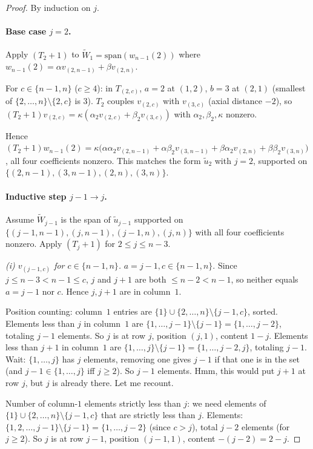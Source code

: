 \documentclass[11pt]{article}
\theoremstyle{definition}
\begin{document}
\begin{proof}
By induction on $j$.

\paragraph{Base case $j = 2$.}  Apply $(T_2{+}1)$ to
$\widetilde{W}_1 = \mathrm{span}(w_{n-1}(2))$ where
$w_{n-1}(2) = \alpha v_{(2,n-1)} + \beta v_{(2,n)}$.

For $c \in \{n-1,n\}$ ($c \ge 4$): in $T_{(2,c)}$, $a = 2$ at $(1,2)$,
$b = 3$ at $(2,1)$ (smallest of $\{2,\ldots,n\}\setminus\{2,c\}$ is
$3$).  $T_2$ couples $v_{(2,c)}$ with $v_{(3,c)}$ (axial distance
$-2$), so $(T_2{+}1)v_{(2,c)} = \kappa(\alpha_2 v_{(2,c)} +
\beta_2 v_{(3,c)})$ with $\alpha_2,\beta_2,\kappa$ nonzero.

Hence $(T_2{+}1)w_{n-1}(2) = \kappa\bigl(\alpha\alpha_2 v_{(2,n-1)} +
\alpha\beta_2 v_{(3,n-1)} + \beta\alpha_2 v_{(2,n)} + \beta\beta_2 v_{(3,n)}\bigr)$,
all four coefficients nonzero.  This matches the form
$\widetilde{u}_2$ with $j = 2$, supported on
$\{(2,n-1),(3,n-1),(2,n),(3,n)\}$.

\paragraph{Inductive step $j-1 \to j$.}  Assume $\widetilde{W}_{j-1}$
is the span of $\widetilde{u}_{j-1}$ supported on
$\{(j-1,n-1),(j,n-1),(j-1,n),(j,n)\}$ with all four coefficients
nonzero.  Apply $(T_j{+}1)$ for $2 \le j \le n-3$.

\emph{(i) $v_{(j-1,c)}$ for $c \in \{n-1, n\}$.} $a = j-1, c \in \{n-1,n\}$.
Since $j \le n-3 < n-1 \le c$, $j$ and $j+1$ are both
$\le n-2 < n-1$, so neither equals $a = j-1$ nor $c$.  Hence $j, j+1$
are in column~$1$.

Position counting: column~$1$ entries are $\{1\}\cup\{2,\ldots,n\}\setminus\{j-1,c\}$,
sorted.  Elements less than $j$ in column~$1$ are
$\{1,\ldots,j-1\}\setminus\{j-1\} = \{1,\ldots,j-2\}$, totaling $j-1$
elements.  So $j$ is at row $j$, position $(j,1)$, content $1-j$.
Elements less than $j+1$ in column~$1$ are
$\{1,\ldots,j\}\setminus\{j-1\} = \{1,\ldots,j-2,j\}$, totaling $j-1$.
Wait: $\{1,\ldots,j\}$ has $j$ elements, removing one gives $j-1$ if
that one is in the set (and $j-1 \in \{1,\ldots,j\}$ iff $j \ge 2$).
So $j-1$ elements.  Hmm, this would put $j+1$ at row $j$, but $j$ is
already there.  Let me recount.

Number of column-$1$ elements strictly less than $j$: we need
elements of $\{1\}\cup\{2,\ldots,n\}\setminus\{j-1,c\}$ that are
strictly less than $j$.  Elements: $\{1,2,\ldots,j-1\}\setminus\{j-1\}
= \{1,\ldots,j-2\}$ (since $c > j$), total $j - 2$ elements (for
$j \ge 2$).  So $j$ is at row $j-1$, position $(j-1,1)$, content
$-(j-2) = 2-j$.


\end{proof}
\end{document}
